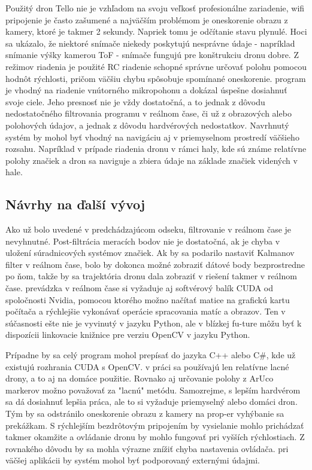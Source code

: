 Použitý dron Tello nie je vzhľadom na svoju veľkosť profesionálne zariadenie, wifi pripojenie je často zašumené a najväčším problémom je oneskorenie obrazu z kamery, ktoré je takmer 2 sekundy. Napriek tomu je odčítanie stavu plynulé. Hoci sa ukázalo, že niektoré snímače niekedy poskytujú nesprávne údaje - napríklad snímanie výšky kamerou ToF - snímače fungujú pre konštrukciu dronu dobre. Z režimov riadenia je použité RC riadenie schopné správne určovať polohu pomocou hodnôt rýchlosti, pričom väčšiu chybu spôsobuje spomínané oneskorenie. program je vhodný na riadenie vnútorného mikropohonu a dokázal úspešne dosiahnuť svoje ciele. Jeho presnosť nie je vždy dostatočná, a to jednak z dôvodu nedostatočného filtrovania programu v reálnom čase, či už z obrazových alebo polohových údajov, a jednak z dôvodu hardvérových nedostatkov. Navrhnutý systém by mohol byť vhodný na navigáciu aj v priemyselnom prostredí väčšieho rozsahu. Napríklad v prípade riadenia dronu v rámci haly, kde sú známe relatívne polohy značiek a dron sa naviguje a zbiera údaje na základe značiek videných v hale.

\subsection{Návrhy na ďalší vývoj}

Ako už bolo uvedené v predchádzajúcom odseku, filtrovanie v reálnom čase je nevyhnutné.  Post-filtrácia meracích bodov nie je dostatočná, ak je chyba v uložení súradnicových systémov značiek. Ak by sa podarilo nastaviť Kalmanov filter v reálnom čase, bolo by dokonca možné zobraziť dátové body bezprostredne po ňom, takže by sa trajektória dronu dala zobraziť v riešení takmer v reálnom čase. prevádzka v reálnom čase si vyžaduje aj softvérový balík CUDA od spoločnosti Nvidia, pomocou ktorého možno načítať matice na grafickú kartu počítača a rýchlejšie vykonávať operácie spracovania matíc a obrazov. Ten v súčasnosti ešte nie je vyvinutý v jazyku Python, ale v blízkej fu-ture môžu byť k dispozícii linkovacie knižnice pre verziu OpenCV v jazyku Python. 

Prípadne by sa celý program mohol prepísať do jazyka C++ alebo C\#, kde už existujú rozhrania CUDA s OpenCV. v práci sa používajú len relatívne lacné drony, a to aj na domáce použitie. Rovnako aj určovanie polohy z ArUco markerov možno považovať za "lacnú" metódu. Samozrejme, s lepším hardvérom sa dá dosiahnuť lepšia práca, ale to si vyžaduje priemyselný alebo domáci dron. Tým by sa odstránilo oneskorenie obrazu z kamery na prop-er vyhýbanie sa prekážkam. S rýchlejším bezdrôtovým pripojením by vysielanie mohlo prichádzať takmer okamžite a ovládanie dronu by mohlo fungovať pri vyšších rýchlostiach. Z rovnakého dôvodu by sa mohla výrazne znížiť chyba nastavenia ovládača. pri väčšej aplikácii by systém mohol byť podporovaný externými údajmi.